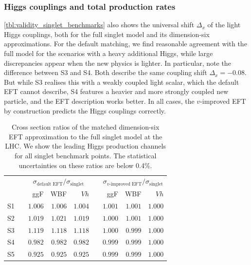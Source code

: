 \subsubsection{Higgs couplings and total production rates}

\autoref{tbl:validity_singlet_benchmarks} also shows the universal
shift $\Delta_x$ of the light Higgs couplings, both for the full
singlet model and its dimension-six approximations. For the default
matching, we find reasonable agreement with the full model for the
scenarios with a heavy additional Higgs, while large discrepancies
appear when the new physics is lighter. In particular, note the
difference between S3 and S4. Both describe the same coupling shift
$\Delta_x = - 0.08$. But while S3 realises this with a weakly coupled
light scalar, which the default EFT cannot describe, S4 features a
heavier and more strongly coupled new particle, and the EFT
description works better.  In all cases, the $v$-improved EFT by
construction predicts the Higgs couplings correctly.

\begin{table}
  \begin{tabular}{c c rrr c rrr}
    \toprule
    \multirow{2}{*}{}
    && \multicolumn{3}{c}{$\sigma_\text{default EFT} / \sigma_\text{singlet}$}
    && \multicolumn{3}{c}{$\sigma_\text{$v$-improved EFT} / \sigma_\text{singlet}$} \\
    \cmidrule{3-5} \cmidrule{7-9}
    && ggF & WBF & $Vh$ && ggF & WBF & $Vh$ \\
    \midrule
    S1 && $1.006$ & $1.006$ & $1.004$ && $1.001$ & $1.001$ & $1.000$ \\
    S2 && $1.019$ & $1.021$ & $1.019$ && $1.000$ & $1.001$ & $1.000$ \\
    S3 && $1.119$ & $1.118$ & $1.118$ && $1.000$ & $0.999$ & $1.000$ \\
    S4 && $0.982$ & $0.982$ & $0.982$ && $0.999$ & $0.999$ & $1.000$ \\
    S5 && $0.925$ & $0.925$ & $0.925$ && $0.999$ & $0.999$ & $1.000$ \\
    \bottomrule
  \end{tabular}
  \caption[Total Higgs production rates in the singlet extension]{Cross
    section ratios of the matched dimension-six EFT
    approximation to the full singlet model at the LHC. We show the
    leading Higgs production channels for all singlet benchmark
    points. The statistical uncertainties on these ratios are below
    0.4\%.}
  \label{tbl:validity_singlet_rates}
\end{table}

